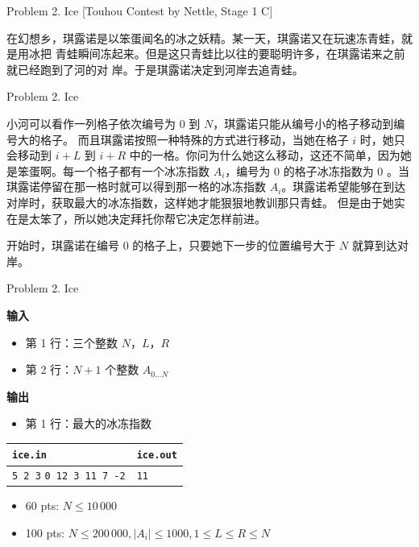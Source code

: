 \documentclass[UTF8]{beamer}
\begin{document}

\begin{frame}{Problem 2. Ice}
[Touhou Contest by Nettle, Stage 1 C]

在幻想乡，琪露诺是以笨蛋闻名的冰之妖精。某一天，琪露诺又在玩速冻青蛙，就是用冰把
青蛙瞬间冻起来。但是这只青蛙比以往的要聪明许多，在琪露诺来之前就已经跑到了河的对
岸。于是琪露诺决定到河岸去追青蛙。

\end{frame}

\begin{frame}{Problem 2. Ice}

小河可以看作一列格子依次编号为 0 到 $N$，琪露诺只能从编号小的格子移动到编号大的格子。
而且琪露诺按照一种特殊的方式进行移动，当她在格子 $i$ 时，她只会移动到 $i+L$ 到 $i+R$
中的一格。你问为什么她这么移动，这还不简单，因为她是笨蛋啊。每一个格子都有一个冰冻指数
$A_i$，编号为 0 的格子冰冻指数为 0 。当琪露诺停留在那一格时就可以得到那一格的冰冻指数
$A_i$。琪露诺希望能够在到达对岸时，获取最大的冰冻指数，这样她才能狠狠地教训那只青蛙。
但是由于她实在是太笨了，所以她决定拜托你帮它决定怎样前进。

开始时，琪露诺在编号 0 的格子上，只要她下一步的位置编号大于 $N$ 就算到达对岸。

\end{frame}

\begin{frame}{Problem 2. Ice}

\textbf{输入}
\begin{itemize}
    \item 第 1 行：三个整数 $N$，$L$，$R$
    \item 第 2 行：$N+1$ 个整数 $A_{0 \dots N}$
\end{itemize}
\textbf{输出}
\begin{itemize}
    \item 第 1 行：最大的冰冻指数
\end{itemize}

\begin{tabularx}{\textwidth}{|X|X|}
\hline
\texttt{\textbf{ice.in}} & \texttt{\textbf{ice.out}} \\ \hline
\texttt{5 2 3}\newline
\texttt{0 12 3 11 7 -2}
&
\texttt{11}
\\ \hline
\end{tabularx}
\newline
\begin{itemize}
    \item 60 pts: $N \leq 10\,000$
    \item 100 pts: $N \leq 200\,000, |A_i| \leq 1000, 1 \leq L \leq R \leq N$
\end{itemize}

\end{frame}
\end{document}
